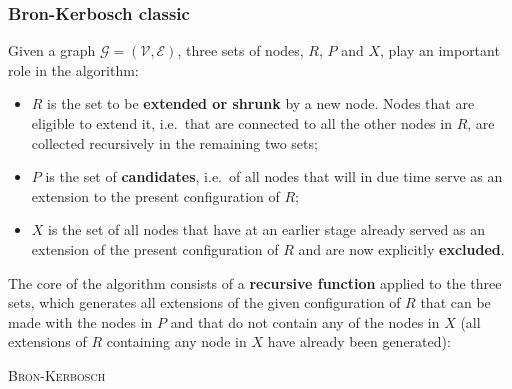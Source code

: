 \documentclass[11pt]{article}
\begin{document}
\hypertarget{classic-bron-kerbosch}{%
\subsubsection{Bron-Kerbosch classic}\label{classic-bron-kerbosch}}

Given a graph \(\mathcal{G}=(\mathcal{V},\mathcal{E})\), three sets of
nodes, \(R\), \(P\) and \(X\), play an important role in the algorithm:

\begin{itemize}
    \item \(R\) is the set to be \textbf{extended or shrunk} by a new node.
Nodes that are eligible to extend it, i.e.~that are connected to all the
other nodes in \(R\), are collected recursively in the remaining two
sets; \item \(P\) is the set of \textbf{candidates}, i.e.~of all nodes that
will in due time serve as an extension to the present configuration of
\(R\); \item \(X\) is the set of all nodes that have at an earlier stage
already served as an extension of the present configuration of \(R\) and
are now explicitly \textbf{excluded}.
\end{itemize}

The core of the algorithm consists of a \textbf{recursive function}
applied to the three sets, which generates all extensions of the given
configuration of \(R\) that can be made with the nodes in \(P\) and that
do not contain any of the nodes in \(X\) (all extensions of \(R\)
containing any node in \(X\) have already been generated):

\begin{algorithm}[H]
\DontPrintSemicolon
\SetAlgoLined

  
  \BlankLine
  \BlankLine
  
  
\caption{\textsc{Bron-Kerbosch}}
\end{algorithm}
\end{document}
